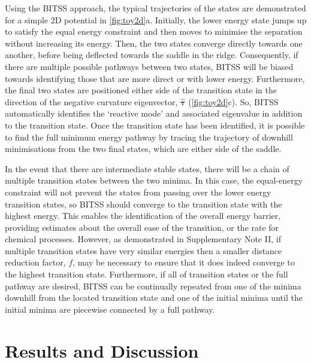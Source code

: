 \documentclass[aip,jcp,reprint,twocolumn]{revtex4-1}
\begin{document}
Using the BITSS approach, the typical trajectories of the states are demonstrated for a simple 2D potential in \cref{fig:toy2d}a.
Initially, the lower energy state jumps up to satisfy the equal energy constraint and then moves to minimise the separation without increasing its energy.
Then, the two states converge directly towards one another, before being deflected towards the saddle in the ridge.
Consequently, if there are multiple possible pathways between two states, BITSS will be biased towards identifying those that are more direct or with lower energy.
Furthermore, the final two states are positioned either side of the transition state in the direction of the negative curvature eigenvector, $\bm{\hat{\tau}}$ (\cref{fig:toy2d}c).
So, BITSS automatically identifies the `reactive mode' and associated eigenvalue in addition to the transition state.
Once the transition state has been identified, it is possible to find the full minimum energy pathway by tracing the trajectory of downhill minimisations from the two final states, which are either side of the saddle.

In the event that there are intermediate stable states, there will be a chain of multiple transition states between the two minima.
In this case, the equal-energy constraint will not prevent the states from passing over the lower energy transition states, so BITSS should converge to the transition state with the highest energy.
This enables the identification of the overall energy barrier, providing estimates about the overall ease of the transition, or the rate for chemical processes.
However, as demonstrated in Supplementary Note II, if multiple transition states have very similar energies then a smaller distance reduction factor, $f$, may be necessary to ensure that it does indeed converge to the highest transition state.
Furthermore, if all of transition states or the full pathway are desired, BITSS can be continually repeated from one of the minima downhill from the located transition state and one of the initial minima until the initial minima are piecewise connected by a full pathway.

\section{Results and Discussion}
\end{document}
